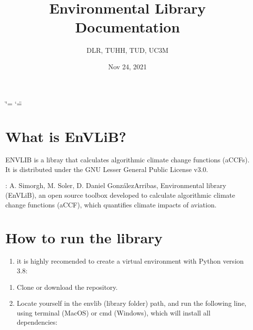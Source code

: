 \documentclass[a4paper,11pt,english]{sphinxmanual}
\title{Environmental Library Documentation}
\date{Nov 24, 2021}
\author{DLR, TUHH, TUD, UC3M}
\begin{document}
\ifdefined\shorthandoff
  \ifnum\catcode`\=\string=\active\shorthandoff{=}\fi
  \ifnum\catcode`\"=\active{}\fi
\fi

\pagestyle{empty}
\sphinxmaketitle
\pagestyle{plain}
\sphinxtableofcontents
\pagestyle{normal}
\label{\detokenize{index::doc}}



\chapter{What is EnVLiB?}
\label{\detokenize{index:what-is-envlib}}
ENVLIB is a libray that calculates algorithmic climate change functions (aCCFs).
It is distributed under the GNU Lesser General Public License v3.0.

: A. Simorgh, M. Soler, D. Daniel González\sphinxhyphen{}Arribas, Environmental library (EnVLiB), an open source toolbox developed to calculate algorithmic climate change functions (aCCF), which quantifies climate impacts of aviation.


\chapter{How to run the library}
\label{\detokenize{index:how-to-run-the-library}}\begin{enumerate}
%
\setcounter{enumi}{-1}
\item {} 
it is highly recomended to create a virtual environment with Python version 3.8:

\end{enumerate}

\begin{sphinxVerbatim}[commandchars=\\\{\}]
    
  
\end{sphinxVerbatim}
\begin{enumerate}
%
\item {} 
Clone or download the repository.

\item {} 
Locate yourself in the envlib (library folder) path, and run the following line, using terminal (MacOS) or cmd (Windows), which will install all dependencies:

\end{enumerate}
\end{document}
